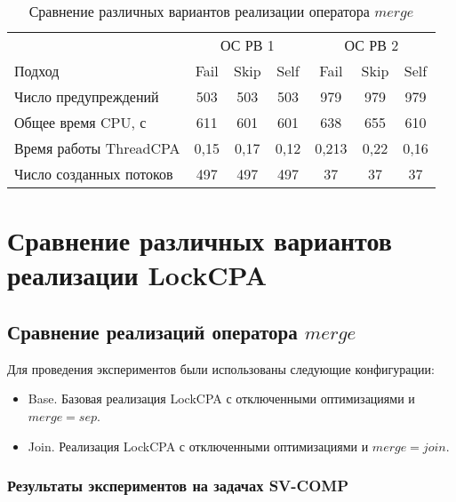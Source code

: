 \begin{center}
  \begin{table}[h]\footnotesize \centering
  	\label{table-drivers-thread-create}
    \caption{Сравнение различных вариантов реализации оператора $merge$}
    \begin{tabular}{ | l | c | c | c | c | c | c |}
      \hline
      						& 		\multicolumn{3}{|c|}{ОС РВ 1} 		& \multicolumn{3}{|c|}{ОС РВ 2} \\
      Подход         				& Fail 		& Skip 		& Self 		& Fail 		& Skip 		& Self  \\ \hline
      Число предупреждений			& 503   	& 503  		& 503  		& 979   	& 979   	& 979   \\ 
  	  Общее время CPU, с 			& 611 		& 601 		& 601  		& 638   	& 655  		& 610   \\ 
\hspace{0.5cm} Время работы ThreadCPA & 0,15	& 0,17 		& 0,12 		& 0,213   	& 0,22 		& 0,16   \\ \hline
      Число созданных потоков  		& 497    	& 497    	& 497   	& 37   		& 37  		& 37   \\ 
      \hline
    \end{tabular}
  \end{table}
\end{center}

\section{Сравнение различных вариантов реализации LockCPA}

\subsection{Сравнение реализаций оператора $merge$ }

Для проведения экспериментов были использованы следующие конфигурации:

\begin{itemize}
\item Base. Базовая реализация LockCPA с отключенными оптимизациями и $merge = sep$.
\item Join. Реализация LockCPA с отключенными оптимизациями и $merge = join$.
\end{itemize}

\subsubsection{Результаты экспериментов на задачах SV-COMP}

